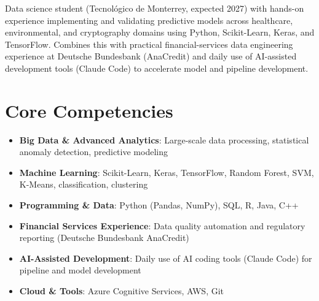 \documentclass[11pt,a4paper,sans]{moderncv}
\begin{document}
\makecvtitle


\vspace{6pt}
\small{Data science student (Tecnológico de Monterrey, expected 2027) with hands-on experience implementing and validating predictive models across healthcare, environmental, and cryptography domains using Python, Scikit-Learn, Keras, and TensorFlow. Combines this with practical financial-services data engineering experience at Deutsche Bundesbank (AnaCredit) and daily use of AI-assisted development tools (Claude Code) to accelerate model and pipeline development.}


\section{Core Competencies}
\vspace{1pt}
\begin{itemize}

\item \textbf{Big Data \& Advanced Analytics}: Large-scale data processing, statistical anomaly detection, predictive modeling

\item \textbf{Machine Learning}: Scikit-Learn, Keras, TensorFlow, Random Forest, SVM, K-Means, classification, clustering

\item \textbf{Programming \& Data}: Python (Pandas, NumPy), SQL, R, Java, C++

\item \textbf{Financial Services Experience}: Data quality automation and regulatory reporting (Deutsche Bundesbank AnaCredit)

\item \textbf{AI-Assisted Development}: Daily use of AI coding tools (Claude Code) for pipeline and model development

\item \textbf{Cloud \& Tools}: Azure Cognitive Services, AWS, Git

\end{itemize}

\end{document}
